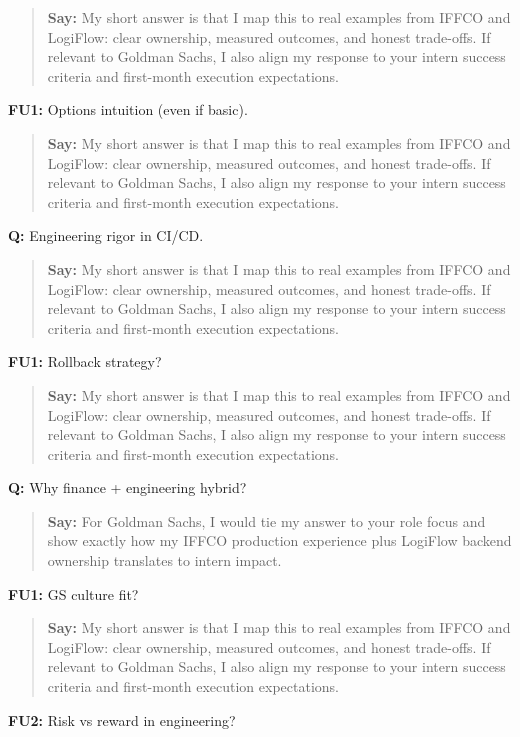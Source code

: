 \documentclass[9pt,a4paper]{article}
\begin{document}
\begin{quote}\small\textbf{Say:} My short answer is that I map this to real examples from IFFCO and LogiFlow: clear ownership, measured outcomes, and honest trade-offs. If relevant to Goldman Sachs, I also align my response to your intern success criteria and first-month execution expectations.\end{quote}
\vspace{2mm}
\textbf{FU1:} Options intuition (even if basic).

\begin{quote}\small\textbf{Say:} My short answer is that I map this to real examples from IFFCO and LogiFlow: clear ownership, measured outcomes, and honest trade-offs. If relevant to Goldman Sachs, I also align my response to your intern success criteria and first-month execution expectations.\end{quote}
\vspace{2mm}
\textbf{Q:} Engineering rigor in CI/CD.

\begin{quote}\small\textbf{Say:} My short answer is that I map this to real examples from IFFCO and LogiFlow: clear ownership, measured outcomes, and honest trade-offs. If relevant to Goldman Sachs, I also align my response to your intern success criteria and first-month execution expectations.\end{quote}
\vspace{2mm}
\textbf{FU1:} Rollback strategy?

\begin{quote}\small\textbf{Say:} My short answer is that I map this to real examples from IFFCO and LogiFlow: clear ownership, measured outcomes, and honest trade-offs. If relevant to Goldman Sachs, I also align my response to your intern success criteria and first-month execution expectations.\end{quote}
\vspace{2mm}
\textbf{Q:} Why finance + engineering hybrid?

\begin{quote}\small\textbf{Say:} For Goldman Sachs, I would tie my answer to your role focus and show exactly how my IFFCO production experience plus LogiFlow backend ownership translates to intern impact.\end{quote}
\vspace{2mm}
\textbf{FU1:} GS culture fit?

\begin{quote}\small\textbf{Say:} My short answer is that I map this to real examples from IFFCO and LogiFlow: clear ownership, measured outcomes, and honest trade-offs. If relevant to Goldman Sachs, I also align my response to your intern success criteria and first-month execution expectations.\end{quote}
\vspace{2mm}
\textbf{FU2:} Risk vs reward in engineering?
\end{document}
